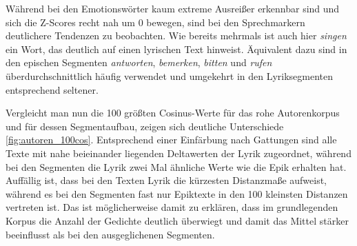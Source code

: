 \documentclass[a4paper,10p]{article}
\begin{document}
Während bei den Emotionswörter kaum extreme Ausreißer erkennbar sind und sich die Z-Scores recht nah um 0 bewegen, sind bei den Sprechmarkern deutlichere Tendenzen zu beobachten. Wie bereits mehrmals ist auch hier \textit{singen} ein Wort, das deutlich auf einen lyrischen Text hinweist. Äquivalent dazu sind in den epischen Segmenten \textit{antworten}, \textit{bemerken}, \textit{bitten} und \textit{rufen} überdurchschnittlich häufig verwendet und umgekehrt in den Lyriksegmenten entsprechend seltener. \par 

Vergleicht man nun die 100 größten Cosinus-Werte für das rohe Autorenkorpus und für dessen Segmentaufbau, zeigen sich deutliche Unterschiede \ref{fig:autoren_100cos}. Entsprechend einer Einfärbung nach Gattungen sind alle Texte mit nahe beieinander liegenden Deltawerten der Lyrik zugeordnet, während bei den Segmenten die Lyrik zwei Mal ähnliche Werte wie die Epik erhalten hat. Auffällig ist, dass bei den Texten Lyrik die kürzesten Distanzmaße aufweist, während es bei den Segmenten fast nur Epiktexte in den 100 kleinsten Distanzen vertreten ist. Das ist möglicherweise damit zu erklären, dass im grundlegenden Korpus die Anzahl der Gedichte deutlich überwiegt und damit das Mittel stärker beeinflusst als bei den ausgeglichenen Segmenten. \par 
\end{document}

